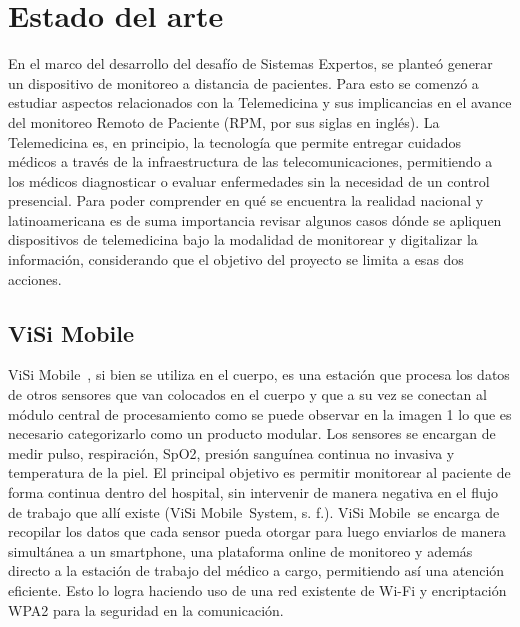 \chapter{Estado del arte}\label{arte}
En el marco del desarrollo del desafío de Sistemas Expertos, se planteó generar un dispositivo de monitoreo a distancia de pacientes. Para esto se comenzó a estudiar aspectos relacionados con la Telemedicina y sus implicancias en el avance del monitoreo Remoto de Paciente (RPM, por sus siglas en inglés). La Telemedicina es, en principio, la tecnología que permite entregar cuidados médicos a través de la infraestructura de las telecomunicaciones, permitiendo a los médicos diagnosticar o evaluar enfermedades sin la necesidad de un control presencial.
Para poder comprender en qué se encuentra la realidad nacional y latinoamericana es de suma importancia revisar algunos casos dónde se apliquen dispositivos de telemedicina bajo la modalidad de monitorear y digitalizar la información, considerando que el objetivo del proyecto se limita a esas dos acciones.

\section{ViSi Mobile\textregistered}
ViSi Mobile\textregistered\ \cite{visi}, si bien se utiliza en el cuerpo, es una estación que procesa los datos de otros sensores que van colocados en el cuerpo y que a su vez se conectan al módulo central de procesamiento como se puede observar en la imagen 1 lo que es necesario categorizarlo como un producto modular. Los sensores se encargan de medir pulso, respiración, SpO2, presión sanguínea continua no invasiva y temperatura de la piel. El principal objetivo es permitir monitorear al paciente de forma continua dentro del hospital, sin intervenir de manera negativa en el flujo de trabajo que allí existe (ViSi Mobile\textregistered\ System, s. f.). ViSi Mobile\textregistered\ se encarga de recopilar los datos que cada sensor pueda otorgar para luego enviarlos de manera simultánea a un smartphone, una plataforma online de monitoreo y además directo a la estación de trabajo del médico a cargo, permitiendo así una atención eficiente. Esto lo logra haciendo uso de una red existente de Wi-Fi y encriptación WPA2 para la seguridad en la comunicación\cite{visi_tel}.

